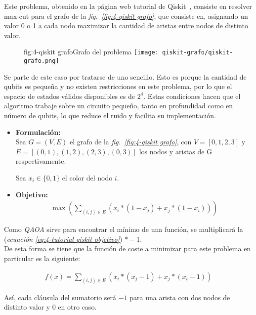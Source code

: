 Este problema, obtenido en la página web tutorial de Qiskit~\cite{qiskit_tutorial_antiguo}, consiste en resolver max-cut para el grafo de la \textit{fig.~\ref{fig:4-qiskit grafo}}, que consiste en, asignando un valor 0 o 1 a cada nodo maximizar la cantidad de aristas entre nodos de distinto valor.

\begin{figure}[Grafo {--} max-cut en grafo de 4 aristas]{fig:4-qiskit grafo}{Grafo del problema\cite{qiskit_tutorial_antiguo}}
  \centering
  \texttt{[image: qiskit-grafo/qiskit-grafo.png]}
\end{figure}

Se parte de este caso por tratarse de uno sencillo.
Esto es porque la cantidad de qubits es pequeña y no existen restricciones en este problema, por lo que el espacio de estados válidos disponibles es de $2^4$.
Estas condiciones hacen que el algoritmo trabaje sobre un circuito pequeño, tanto en profundidad como en número de qubits, lo que reduce el ruido y facilita su implementación. 

\begin{itemize}
\item \textbf{Formulación:} \\
  Sea $G = (V, E)$ el grafo de la \textit{fig.~\ref{fig:4-qiskit grafo}}, con $V = [0, 1, 2, 3]$ y $E = [(0, 1), (1, 2), (2, 3), (0, 3)]$ los nodos y aristas de G respectivamente.

  Sea $x_i \in \{0, 1\}$ el color del nodo $i$.

\item \textbf{Objetivo:} \\
  \begin{align}\label{eq:4-tutorial qiskit objetivo}
    \max(\sum_{(i, j) \in E} (x_i * (1 - x_j) + x_j * (1 - x_i)))
  \end{align}

\end{itemize}

Como \textit{QAOA} sirve para encontrar el mínimo de una función, se multiplicará la (\textit{ecuación \ref{eq:4-tutorial qiskit objetivo}}) $*-1$.
\\
De esta forma se tiene que la función de coste a minimizar para este problema en particular es la siguiente:

\begin{align}
  f(x) = \sum_{(i, j) \in E} (x_i * (x_j - 1) + x_j * (x_i - 1))
\end{align}

Así, cada cláusula del sumatorio será $-1$ para una arista con dos nodos de distinto valor y 0 en otro caso.

